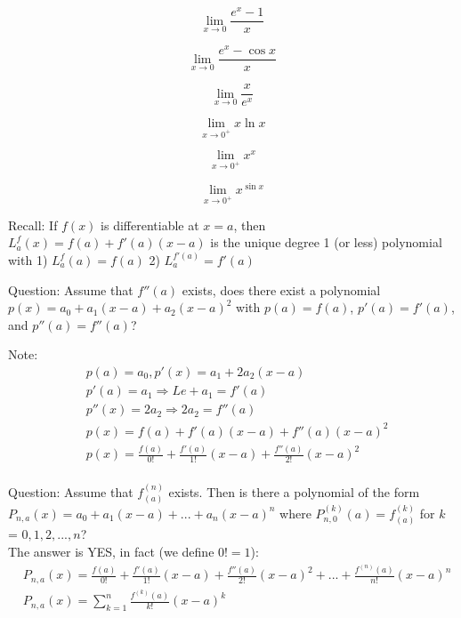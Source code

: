 
\begin{exmp}
\[\lim_{x\to 0} \frac{e^x-1}{x}\]
\end{exmp}


\begin{exmp}
\[\lim_{x\to 0} \frac{e^x-\cos x}{x}\]
\end{exmp}

\begin{exmp}
\[\lim_{x\to 0} \frac{x}{e^x}\]
\end{exmp}

\begin{exmp}
\[\lim_{x\to 0^+} x\ln x\]
\end{exmp}

\begin{exmp}
\[\lim_{x\to 0^+} x^x\]
\end{exmp}

\begin{exmp}
\[\lim_{x\to 0^+} x^{\sin x}\]
\end{exmp}

\begin{defn}
Recall: If $f(x)$ is differentiable at $x = a$, then $L_a^f(x) = f(a) + f'(a)(x-a)$ is the unique degree 1 (or less) polynomial with 1) $L_a^f(a) = f(a)$ 2) $L_a^{f'(a)}=f'(a)$
\end{defn}

Question: Assume that $f''(a)$ exists, does there exist a polynomial $p(x) = a_0 +a_1(x-a)+a_2(x-a)^2$
with $p(a) = f(a)$, $p'(a) = f'(a)$, and $p''(a) = f''(a)$?

Note: 
\begin{align*}
    &p(a) = a_0, p'(x) = a_1 + 2a_2(x-a)\\
    &p'(a) = a_1 \Rightarrow Le + a_1 = f'(a)\\
    &p''(x) = 2a_2 \Rightarrow 2a_2 = f''(a)\\
    &p(x) = f(a) + f'(a)(x-a) + f''(a)(x-a)^2\\
    &p(x) = \frac{f(a)}{0!} + \frac{f'(a)}{1!}(x-a) + \frac{f''(a)}{2!}(x-a)^2\\
\end{align*}

Question: 
Assume that $f^{(n)}_{(a)}$ exists. Then is there a polynomial of the form $P_{n,a}(x) = a_0 + a_1(x-a) +...+ a_n(x-a)^n$ where $P^{(k)}_{n,0}(a) = f_{(a)}^{(k)}$ for $k$ = $0,1,2,...,n$?\\

The answer is YES, in fact (we define $0! = 1$):
\begin{align*}
    &P_{n,a}(x) = \frac{f(a)}{0!} + \frac{f'(a)}{1!}(x-a) + \frac{f''(a)}{2!}(x-a)^2 + ... + \frac{f^{(n)}(a)}{n!}(x-a)^n\\
    &P_{n,a}(x) = \sum_{k=1}^n\frac{f^{(k)}(a)}{k!}(x-a)^k
\end{align*}




